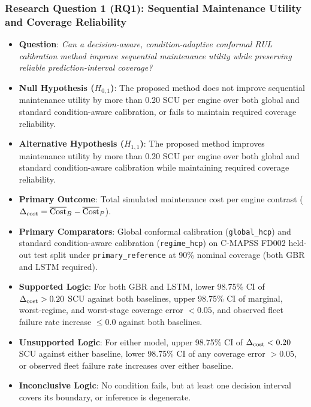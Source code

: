 \subsubsection*{Research Question 1 (RQ1): Sequential Maintenance Utility and Coverage Reliability}
\begin{itemize}
  \item \textbf{Question}: \textit{Can a decision-aware, condition-adaptive conformal RUL calibration method improve sequential maintenance utility while preserving reliable prediction-interval coverage?}
  \item \textbf{Null Hypothesis ($H_{0,1}$)}: The proposed method does not improve sequential maintenance utility by more than 0.20 SCU per engine over both global and standard condition-aware calibration, or fails to maintain required coverage reliability.
  \item \textbf{Alternative Hypothesis ($H_{1,1}$)}: The proposed method improves maintenance utility by more than 0.20 SCU per engine over both global and standard condition-aware calibration while maintaining required coverage reliability.
  \item \textbf{Primary Outcome}: Total simulated maintenance cost per engine contrast ($\Delta_{\text{cost}} = \overline{\text{Cost}}_B - \overline{\text{Cost}}_P$).
  \item \textbf{Primary Comparators}: Global conformal calibration (\texttt{global\_hcp}) and standard condition-aware calibration (\texttt{regime\_hcp}) on C-MAPSS FD002 held-out test split under \texttt{primary\_reference} at 90\% nominal coverage (both GBR and LSTM required).
  \item \textbf{Supported Logic}: For both GBR and LSTM, lower 98.75\% CI of $\Delta_{\text{cost}} > 0.20$ SCU against both baselines, upper 98.75\% CI of marginal, worst-regime, and worst-stage coverage error $< 0.05$, and observed fleet failure rate increase $\le 0.0$ against both baselines.
  \item \textbf{Unsupported Logic}: For either model, upper 98.75\% CI of $\Delta_{\text{cost}} < 0.20$ SCU against either baseline, lower 98.75\% CI of any coverage error $> 0.05$, or observed fleet failure rate increases over either baseline.
  \item \textbf{Inconclusive Logic}: No condition fails, but at least one decision interval covers its boundary, or inference is degenerate.
\end{itemize}

